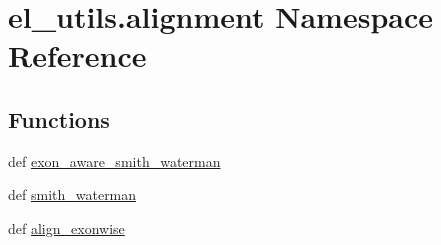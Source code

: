 \hypertarget{namespaceel__utils_1_1alignment}{\section{el\-\_\-utils.\-alignment Namespace Reference}
\label{namespaceel__utils_1_1alignment}
}
\subsection*{Functions}
\begin{DoxyCompactItemize}
\item 
def \hyperlink{namespaceel__utils_1_1alignment_a5e01c30043221f9f1c35051e061c1827}{exon\-\_\-aware\-\_\-smith\-\_\-waterman}
\item 
def \hyperlink{namespaceel__utils_1_1alignment_a19941e6b5397f971136358a3562926cf}{smith\-\_\-waterman}
\item 
def \hyperlink{namespaceel__utils_1_1alignment_a458bf40e315b5784b206b31e5de7e045}{align\-\_\-exonwise}
\end{DoxyCompactItemize}


